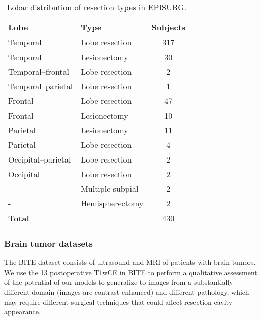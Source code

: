 \begin{table}
  \centering
  \setlength{\tabcolsep}{12pt}
  \caption{
    Lobar distribution of resection types in EPISURG.
  }
  \label{tab:episurg}
  \begin{tabular}{llS[table-format=3.0]}
    \toprule
    \textbf{Lobe}       & \textbf{Type}    & \textbf{Subjects} \\
    \midrule
    Temporal            & Lobe resection   &        317 \\
    Temporal            & Lesionectomy     &         30 \\
    Temporal--frontal   & Lobe resection   &          2 \\
    Temporal--parietal  & Lobe resection   &          1 \\
    Frontal             & Lobe resection   &         47 \\
    Frontal             & Lesionectomy     &         10 \\
    Parietal            & Lesionectomy     &         11 \\
    Parietal            & Lobe resection   &          4 \\
    Occipital--parietal & Lobe resection   &          2 \\
    Occipital           & Lobe resection   &          2 \\
    -                   & Multiple subpial &          2 \\
    -                   & Hemispherectomy  &          2 \\
    \midrule
    \textbf{Total}      &                  &        430 \\
    \bottomrule
  \end{tabular}
\end{table}



\subsubsection{Brain tumor datasets}

The \ac{BITE} dataset \cite{mercier_online_2012} consists of ultrasound and \ac{MRI} of patients with brain tumors.
We use the 13 postoperative \ac{T1wCE} in \ac{BITE} to perform a qualitative assessment of the potential of our models to generalize to images from a substantially different domain (images are contrast-enhanced) and different pathology, which may require different surgical techniques that could affect resection cavity appearance.



